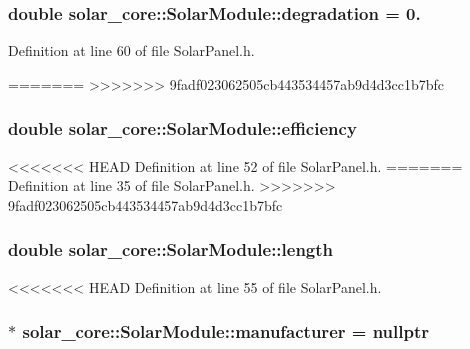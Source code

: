 \subsubsection[{degradation}]{\setlength{\rightskip}{0pt plus 5cm}double solar\+\_\+core\+::\+Solar\+Module\+::degradation = 0.}\label{classsolar__core_1_1_solar_module_a9c6d7e0ef28958ac1da73a1e48a1373d}


Definition at line 60 of file Solar\+Panel.\+h.

=======
>>>>>>> 9fadf023062505cb443534457ab9d4d3cc1b7bfc
\hypertarget{classsolar__core_1_1_solar_module_a0303a0da750be23a4a408645d838ed24}{}
\subsubsection[{efficiency}]{\setlength{\rightskip}{0pt plus 5cm}double solar\+\_\+core\+::\+Solar\+Module\+::efficiency}\label{classsolar__core_1_1_solar_module_a0303a0da750be23a4a408645d838ed24}


<<<<<<< HEAD
Definition at line 52 of file Solar\+Panel.\+h.
=======
Definition at line 35 of file Solar\+Panel.\+h.
>>>>>>> 9fadf023062505cb443534457ab9d4d3cc1b7bfc

\hypertarget{classsolar__core_1_1_solar_module_a34cc7ce18770e51c87a3655f6f481be0}{}
\subsubsection[{length}]{\setlength{\rightskip}{0pt plus 5cm}double solar\+\_\+core\+::\+Solar\+Module\+::length}\label{classsolar__core_1_1_solar_module_a34cc7ce18770e51c87a3655f6f481be0}


<<<<<<< HEAD
Definition at line 55 of file Solar\+Panel.\+h.

\hypertarget{classsolar__core_1_1_solar_module_a32c10820046565c531a3e1a0fd8107b0}{}
\subsubsection[{manufacturer}]{$\ast$ solar\+\_\+core\+::\+Solar\+Module\+::manufacturer = nullptr}\label{classsolar__core_1_1_solar_module_a32c10820046565c531a3e1a0fd8107b0}


